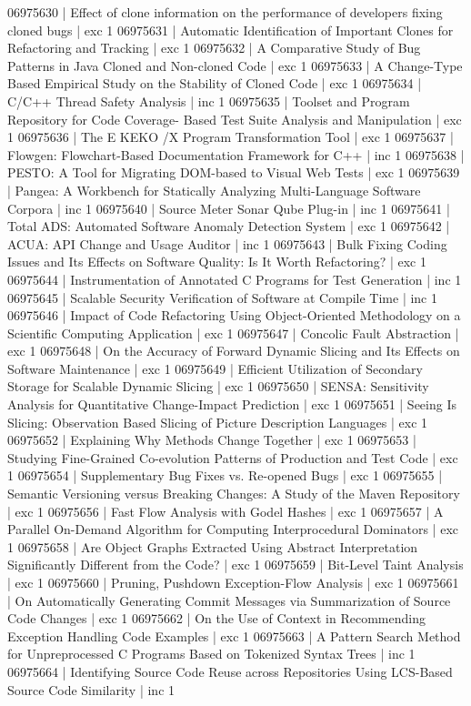 \documentclass[12pt]{article}
\begin{document}
06975630 | Effect of clone information on the performance of developers fixing cloned bugs | exc 1
06975631 | Automatic Identification of Important Clones for Refactoring and Tracking | exc 1
06975632 | A Comparative Study of Bug Patterns in Java Cloned and Non-cloned Code | exc 1
06975633 | A Change-Type Based Empirical Study on the Stability of Cloned Code | exc 1
06975634 | C/C++ Thread Safety Analysis | inc 1
06975635 | Toolset and Program Repository for Code Coverage- Based Test Suite Analysis and Manipulation | exc 1
06975636 | The E KEKO /X Program Transformation Tool | exc 1
06975637 | Flowgen: Flowchart-Based Documentation Framework for C++ | inc 1
06975638 | PESTO: A Tool for Migrating DOM-based to Visual Web Tests | exc 1
06975639 | Pangea: A Workbench for Statically Analyzing Multi-Language Software Corpora | inc 1
06975640 | Source Meter Sonar Qube Plug-in | inc 1
06975641 | Total ADS: Automated Software Anomaly Detection System | exc 1
06975642 | ACUA: API Change and Usage Auditor | inc 1
06975643 | Bulk Fixing Coding Issues and Its Effects on Software Quality: Is It Worth Refactoring? | exc 1
06975644 | Instrumentation of Annotated C Programs for Test Generation | inc 1
06975645 | Scalable Security Verification of Software at Compile Time | inc 1
06975646 | Impact of Code Refactoring Using Object-Oriented Methodology on a Scientific Computing Application | exc 1
06975647 | Concolic Fault Abstraction | exc 1
06975648 | On the Accuracy of Forward Dynamic Slicing and Its Effects on Software Maintenance | exc 1
06975649 | Efficient Utilization of Secondary Storage for Scalable Dynamic Slicing | exc 1
06975650 | SENSA: Sensitivity Analysis for Quantitative Change-Impact Prediction | exc 1
06975651 | Seeing Is Slicing: Observation Based Slicing of Picture Description Languages | exc 1
06975652 | Explaining Why Methods Change Together | exc 1
06975653 | Studying Fine-Grained Co-evolution Patterns of Production and Test Code | exc 1
06975654 | Supplementary Bug Fixes vs. Re-opened Bugs | exc 1
06975655 | Semantic Versioning versus Breaking Changes: A Study of the Maven Repository | exc 1
06975656 | Fast Flow Analysis with Godel Hashes | exc 1
06975657 | A Parallel On-Demand Algorithm for Computing Interprocedural Dominators | exc 1
06975658 | Are Object Graphs Extracted Using Abstract Interpretation Significantly Different from the Code? | exc 1
06975659 | Bit-Level Taint Analysis | exc 1
06975660 | Pruning, Pushdown Exception-Flow Analysis | exc 1
06975661 | On Automatically Generating Commit Messages via Summarization of Source Code Changes | exc 1
06975662 | On the Use of Context in Recommending Exception Handling Code Examples | exc 1
06975663 | A Pattern Search Method for Unpreprocessed C Programs Based on Tokenized Syntax Trees | inc 1
06975664 | Identifying Source Code Reuse across Repositories Using LCS-Based Source Code Similarity | inc 1
\end{document}
